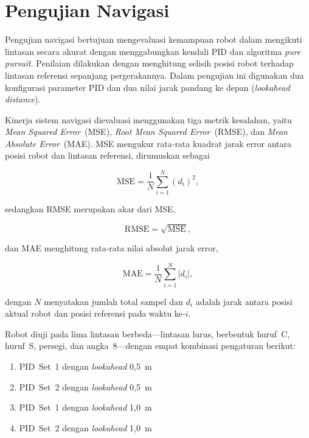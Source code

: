 \section{Pengujian Navigasi}

Pengujian navigasi bertujuan mengevaluasi kemampuan robot dalam mengikuti
lintasan secara akurat dengan menggabungkan kendali PID dan algoritma
\textit{pure pursuit}. Penilaian dilakukan dengan menghitung selisih posisi
robot terhadap lintasan referensi sepanjang pergerakannya. Dalam pengujian
ini digunakan dua konfigurasi parameter PID dan dua nilai jarak pandang ke
depan (\textit{lookahead distance}).

Kinerja sistem navigasi dievaluasi menggunakan tiga metrik kesalahan, yaitu
\textit{Mean Squared Error}~(MSE), \textit{Root Mean Squared Error}~(RMSE),
dan \textit{Mean Absolute Error}~(MAE). MSE mengukur rata‑rata kuadrat jarak
error antara posisi robot dan lintasan referensi, dirumuskan sebagai

\begin{equation}
  \text{MSE}= \frac{1}{N}\sum_{i=1}^{N}(d_{i})^{2},
\end{equation}

\noindent
sedangkan RMSE merupakan akar dari MSE,

\begin{equation}
  \text{RMSE}= \sqrt{\text{MSE}},
\end{equation}

\noindent
dan MAE menghitung rata‑rata nilai absolut jarak error,

\begin{equation}
  \text{MAE}= \frac{1}{N}\sum_{i=1}^{N}\lvert d_{i}\rvert,
\end{equation}

\noindent
dengan $N$ menyatakan jumlah total sampel dan $d_{i}$ adalah jarak antara
posisi aktual robot dan posisi referensi pada waktu ke‑$i$.

Robot diuji pada lima lintasan berbeda—lintasan lurus, berbentuk huruf~C,
huruf~S, persegi, dan angka~8—dengan empat kombinasi pengaturan berikut:

\begin{enumerate}
  \item PID~Set~1 dengan \textit{lookahead} 0{,}5~m
  \item PID~Set~2 dengan \textit{lookahead} 0{,}5~m
  \item PID~Set~1 dengan \textit{lookahead} 1{,}0~m
  \item PID~Set~2 dengan \textit{lookahead} 1{,}0~m
\end{enumerate}

